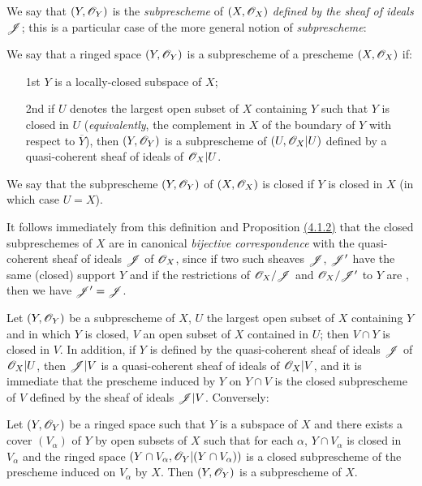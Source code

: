 We say that $(Y,\mathscr{O}_Y)$ is the {\em subprescheme} of $(X,\mathscr{O}_X)$ {\em defined by the
sheaf of ideals $\mathscr{J}$}; this is a particular case of the more general notion of
{\em subprescheme}:

\begin{defn}[4.1.3]
\label{1.4.1.3}
We say that a ringed space $(Y,\mathscr{O}_Y)$ is a subprescheme of a prescheme $(X,\mathscr{O}_X)$ if:
\begin{enumerate}
  \item[1st] $Y$ is a locally-closed subspace of $X$;
  \item[2nd] if $U$ denotes the largest open subset of $X$ containing $Y$ such that
    $Y$ is closed in $U$ ({\em equivalently}, the complement in $X$ of the
    boundary of $Y$ with respect to $\overline{Y}$), then $(Y,\mathscr{O}_Y)$ is
    a subprescheme of $(U,\mathscr{O}_X|U)$ defined by a quasi-coherent sheaf of ideals of $\mathscr{O}_X|U$.
\end{enumerate}
We say that the subprescheme $(Y,\mathscr{O}_Y)$ of $(X,\mathscr{O}_X)$ is closed if $Y$ is closed in $X$
(in which case $U=X$).
\end{defn}

It follows immediately from this definition and Proposition \hyperref[1.4.1.2]{(4.1.2)}
that the closed subpreschemes of $X$ are in canonical {\em bijective correspondence} with the
quasi-coherent sheaf of ideals $\mathscr{J}$ of $\mathscr{O}_X$, since if two such sheaves
$\mathscr{J}$, $\mathscr{J}'$ have the same (closed) support $Y$ and if the restrictions of
$\mathscr{O}_X/\mathscr{J}$ and $\mathscr{O}_X/\mathscr{J}'$ to $Y$ are , then we have $\mathscr{J}'=\mathscr{J}$.

\begin{env}[4.1.4]
\label{1.4.1.4}
Let $(Y,\mathscr{O}_Y)$ be a subprescheme of $X$, $U$ the largest open subset of $X$ containing $Y$
and in which $Y$ is closed, $V$ an open subset of $X$ contained in $U$; then $V\cap Y$ is
closed in $V$. In addition, if $Y$ is defined by the quasi-coherent sheaf of ideals $\mathscr{J}$
of $\mathscr{O}_X|U$, then $\mathscr{J}|V$ is a quasi-coherent sheaf of ideals of $\mathscr{O}_X|V$, and it is
immediate that the prescheme induced by $Y$ on $Y\cap V$ is the closed subprescheme of $V$
defined by the sheaf of ideals $\mathscr{J}|V$. Conversely:
\end{env}

\begin{prop}[4.1.5]
\label{1.4.1.5}
Let $(Y,\mathscr{O}_Y)$ be a ringed space such that $Y$ is a subspace of $X$ and there exists a
cover $(V_\alpha)$ of $Y$ by open subsets of $X$ such that for each $\alpha$,
$Y\cap V_\alpha$ is closed in $V_\alpha$ and the ringed space
$(Y\cap V_\alpha,\mathscr{O}_Y|(Y\cap V_\alpha))$ is a closed subprescheme of the prescheme induced
on $V_\alpha$ by $X$. Then $(Y,\mathscr{O}_Y)$ is a subprescheme of $X$.
\end{prop}

